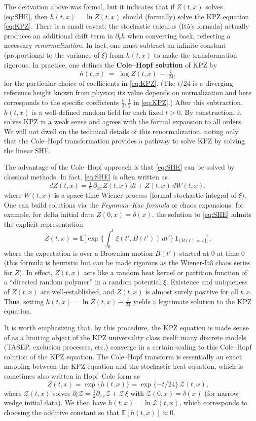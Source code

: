 \documentclass[letterpaper,11pt,oneside,reqno]{article}
\numberwithin{equation}{section}
\theoremstyle{definition}
\begin{document}
The derivation above was formal, but it indicates that if $Z(t,x)$ solves \eqref{eq:SHE}, then $h(t,x)=\ln Z(t,x)$ should (formally) solve the KPZ equation \eqref{eq:KPZ}. There is a small caveat: the stochastic calculus (Itô’s formula) actually produces an additional drift term in $\partial_t h$ when converting back, reflecting a necessary \emph{renormalization}. In fact, one must subtract an infinite constant (proportional to the variance of $\xi$) from $h(t,x)$ to make the transformation rigorous. In practice, one defines the \textbf{Cole–Hopf solution} of KPZ by
\[ h(t,x) \;=\; \log Z(t,x) \,-\, \tfrac{t}{24}, \]
for the particular choice of coefficients in \eqref{eq:KPZ}. (The $t/24$ is a diverging reference height known from physics; its value depends on normalization and here corresponds to the specific coefficients $\frac12,\frac12$ in \eqref{eq:KPZ}.) After this subtraction, $h(t,x)$ is a well-defined random field for each fixed $t>0$. By construction, it solves KPZ in a weak sense and agrees with the formal expansion to all orders. We will not dwell on the technical details of this renormalization, noting only that the Cole–Hopf transformation provides a pathway to solve KPZ by solving the linear SHE.

The advantage of the Cole–Hopf approach is that \eqref{eq:SHE} can be solved by classical methods. In fact, \eqref{eq:SHE} is often written as
\[ dZ(t,x) = \tfrac{1}{2}\,\partial_{xx}Z(t,x)\,dt + Z(t,x)\,dW(t,x), \]
where $W(t,x)$ is a space-time Wiener process (formal stochastic integral of $\xi$). One can build solutions via the \emph{Feynman–Kac formula} or chaos expansions: for example, for delta initial data $Z(0,x)=\delta(x)$, the solution to \eqref{eq:SHE} admits the explicit representation
\[ Z(t,x) = \mathbb{E}\Big[\exp\Big\{\int_0^t \xi(t',B(t'))\,dt'\Big\}\, \mathbf{1}_{\{B(t)=x\}}\Big], \]
where the expectation is over a Brownian motion $B(t')$ started at $0$ at time $0$ (this formula is heuristic but can be made rigorous as the Wiener-Itô chaos series for $Z$). In effect, $Z(t,x)$ acts like a random heat kernel or partition function of a “directed random polymer” in a random potential $\xi$. Existence and uniqueness of $Z(t,x)$ are well-established, and $Z(t,x)$ is almost surely positive for all $t,x$. Thus, setting $h(t,x)=\ln Z(t,x) - \frac{t}{24}$ yields a legitimate solution to the KPZ equation.

It is worth emphasizing that, by this procedure, the KPZ equation is made sense of as a limiting object of the KPZ universality class itself: many discrete models (TASEP, exclusion processes, etc.) converge in a certain scaling to this Cole–Hopf solution of the KPZ equation. The Cole–Hopf transform is essentially an exact mapping between the KPZ equation and the stochastic heat equation, which is sometimes also written in Hopf–Cole form as
\[ Z(t,x) = \exp\{h(t,x)\} = \exp\!\{ -t/24\}\,\mathcal{Z}(t,x), \]
where $\mathcal{Z}(t,x)$ solves $\partial_t \mathcal{Z} = \frac12\partial_{xx}\mathcal{Z} + \mathcal{Z}\,\xi$ with $\mathcal{Z}(0,x)=\delta(x)$ (for narrow wedge initial data). We then have $h(t,x) = \ln \mathcal{Z}(t,x)$, which corresponds to choosing the additive constant so that $\mathbb{E}[h(t,x)]\approx 0$.
\end{document}
